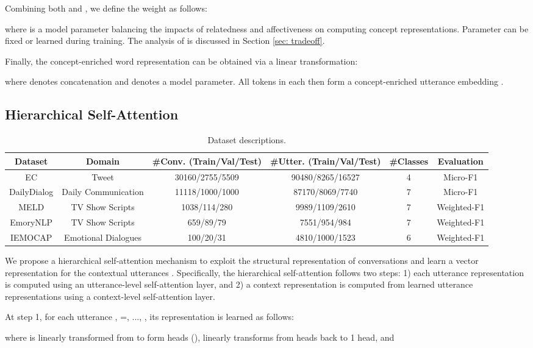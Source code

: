 \documentclass[11pt,a4paper]{article}
\begin{document}
Combining both  and , we define the weight  as follows:

where  is a model parameter balancing the impacts of relatedness and affectiveness on computing concept representations. Parameter  can be fixed or learned during training. The analysis of  is discussed in Section \ref{sec: tradeoff}.

Finally, the concept-enriched word representation  can be obtained via a linear transformation:

where  denotes concatenation and  denotes a model parameter. All  tokens in each  then form a concept-enriched utterance embedding .

\subsection{Hierarchical Self-Attention}
\begin{table*}[!t]
\small
\centering
\begin{tabular}{cccccc}
 \hline
 \textbf{Dataset} & \textbf{Domain} & \textbf{\#Conv. (Train/Val/Test)}& \textbf{\#Utter. (Train/Val/Test)}& \textbf{\#Classes}& \textbf{Evaluation}\\
 \hline
 EC &Tweet&30160/2755/5509&90480/8265/16527&4&Micro-F1\\
 DailyDialog &Daily Communication&11118/1000/1000&87170/8069/7740&7&Micro-F1\\
 MELD &TV Show Scripts&1038/114/280&9989/1109/2610&7&Weighted-F1\\
 EmoryNLP &TV Show Scripts&659/89/79&7551/954/984&7&Weighted-F1\\
 IEMOCAP &Emotional Dialogues&100/20/31&4810/1000/1523&6&Weighted-F1\\
 \hline
\end{tabular}
\caption{Dataset descriptions.}
\label{table: dataset}
\end{table*}
We propose a hierarchical self-attention mechanism to exploit the structural representation of conversations and learn a vector representation for the contextual utterances . Specifically, the hierarchical self-attention follows two steps: 1) each utterance representation is computed using an utterance-level self-attention layer, and 2) a context representation is computed from  learned utterance representations using a context-level self-attention layer. 

At step 1, for each utterance , =, ..., , its representation  is learned as follows:

where  is linearly transformed from  to form  heads (),  linearly transforms from  heads back to 1 head, and 
\end{document}
